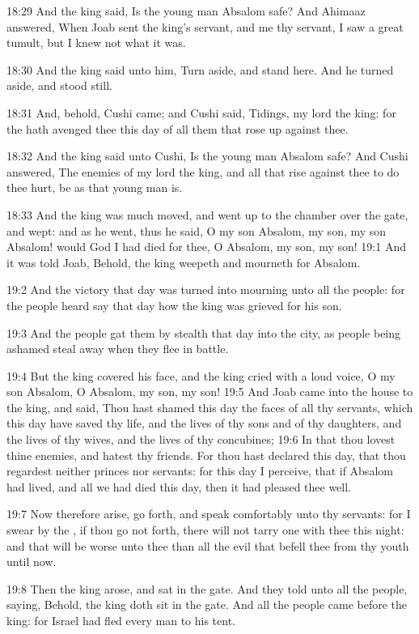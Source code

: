 18:29 And the king said, Is the young man Absalom safe? And Ahimaaz
answered, When Joab sent the king's servant, and me thy servant, I saw
a great tumult, but I knew not what it was.

18:30 And the king said unto him, Turn aside, and stand here. And he
turned aside, and stood still.

18:31 And, behold, Cushi came; and Cushi said, Tidings, my lord the
king: for the \LORD hath avenged thee this day of all them that rose up
against thee.

18:32 And the king said unto Cushi, Is the young man Absalom safe? And
Cushi answered, The enemies of my lord the king, and all that rise
against thee to do thee hurt, be as that young man is.

18:33 And the king was much moved, and went up to the chamber over the
gate, and wept: and as he went, thus he said, O my son Absalom, my
son, my son Absalom! would God I had died for thee, O Absalom, my son,
my son!  19:1 And it was told Joab, Behold, the king weepeth and
mourneth for Absalom.

19:2 And the victory that day was turned into mourning unto all the
people: for the people heard say that day how the king was grieved for
his son.

19:3 And the people gat them by stealth that day into the city, as
people being ashamed steal away when they flee in battle.

19:4 But the king covered his face, and the king cried with a loud
voice, O my son Absalom, O Absalom, my son, my son!  19:5 And Joab
came into the house to the king, and said, Thou hast shamed this day
the faces of all thy servants, which this day have saved thy life, and
the lives of thy sons and of thy daughters, and the lives of thy
wives, and the lives of thy concubines; 19:6 In that thou lovest thine
enemies, and hatest thy friends. For thou hast declared this day, that
thou regardest neither princes nor servants: for this day I perceive,
that if Absalom had lived, and all we had died this day, then it had
pleased thee well.

19:7 Now therefore arise, go forth, and speak comfortably unto thy
servants: for I swear by the \LORD, if thou go not forth, there will
not tarry one with thee this night: and that will be worse unto thee
than all the evil that befell thee from thy youth until now.

19:8 Then the king arose, and sat in the gate. And they told unto all
the people, saying, Behold, the king doth sit in the gate. And all the
people came before the king: for Israel had fled every man to his
tent.

